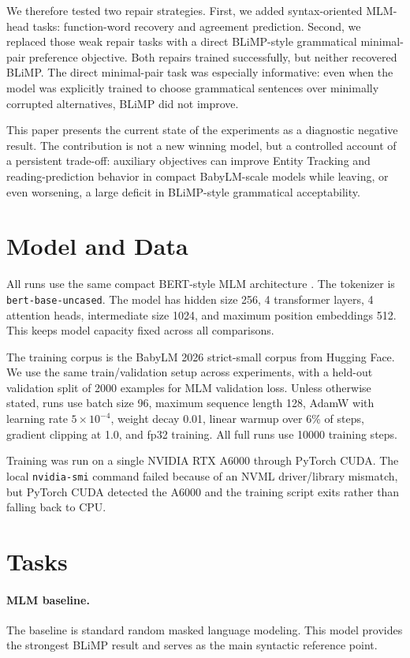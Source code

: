 \documentclass[11pt]{article}
\begin{document}
We therefore tested two repair strategies. First, we added syntax-oriented MLM-head tasks: function-word recovery and agreement prediction. Second, we replaced those weak repair tasks with a direct BLiMP-style grammatical minimal-pair preference objective. Both repairs trained successfully, but neither recovered BLiMP. The direct minimal-pair task was especially informative: even when the model was explicitly trained to choose grammatical sentences over minimally corrupted alternatives, BLiMP did not improve.

This paper presents the current state of the experiments as a diagnostic negative result. The contribution is not a new winning model, but a controlled account of a persistent trade-off: auxiliary objectives can improve Entity Tracking and reading-prediction behavior in compact BabyLM-scale models while leaving, or even worsening, a large deficit in BLiMP-style grammatical acceptability.

\section{Model and Data}

All runs use the same compact BERT-style MLM architecture \citep{devlin2019bert}. The tokenizer is \texttt{bert-base-uncased}. The model has hidden size 256, 4 transformer layers, 4 attention heads, intermediate size 1024, and maximum position embeddings 512. This keeps model capacity fixed across all comparisons.

The training corpus is the BabyLM 2026 strict-small corpus from Hugging Face. We use the same train/validation setup across experiments, with a held-out validation split of 2000 examples for MLM validation loss. Unless otherwise stated, runs use batch size 96, maximum sequence length 128, AdamW with learning rate $5 \times 10^{-4}$, weight decay 0.01, linear warmup over 6\% of steps, gradient clipping at 1.0, and fp32 training. All full runs use 10000 training steps.

Training was run on a single NVIDIA RTX A6000 through PyTorch CUDA. The local \texttt{nvidia-smi} command failed because of an NVML driver/library mismatch, but PyTorch CUDA detected the A6000 and the training script exits rather than falling back to CPU.

\section{Tasks}

\paragraph{MLM baseline.}
The baseline is standard random masked language modeling. This model provides the strongest BLiMP result and serves as the main syntactic reference point.
\end{document}
